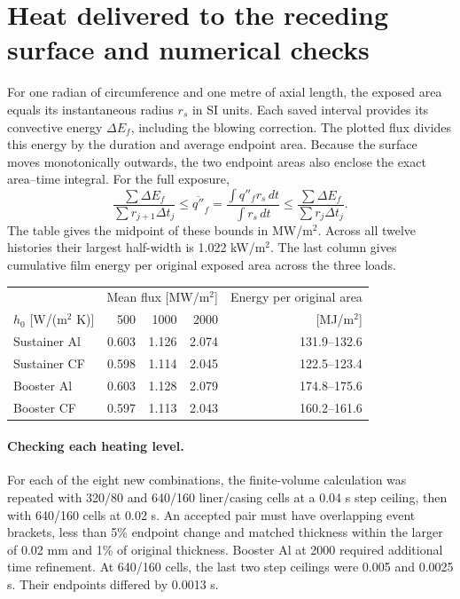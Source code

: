 \section{Heat delivered to the receding surface and numerical checks}
For one radian of circumference and one metre of axial length, the exposed
area equals its instantaneous radius $r_s$ in SI units. Each saved interval
provides its convective energy $\Delta E_f$, including the blowing correction.
The plotted flux divides this energy by the duration and average endpoint area.
Because the surface moves monotonically outwards, the two endpoint areas
also enclose the exact area--time integral. For the full exposure,
\[
 \frac{\sum\Delta E_f}{\sum r_{j+1}\Delta t_j}
 \leq \overline{q''}_f =
 \frac{\int q''_f r_s\,dt}{\int r_s\,dt}
 \leq \frac{\sum\Delta E_f}{\sum r_j\Delta t_j}.
\]
The table gives the midpoint of these bounds in MW/m$^2$. Across all
twelve histories their largest half-width is 1.022 kW/m$^2$. The last column
gives cumulative film energy per original exposed area across the three loads.
\begin{table}[H]\centering\begin{tabular}{lrrrr}\toprule
 & \multicolumn{3}{c}{Mean flux [MW/m$^2$]} & Energy per original area\\
$h_0$ [W/(m$^2$ K)] & 500 & 1000 & 2000 & [MJ/m$^2$] \\\midrule
Sustainer Al & 0.603 & 1.126 & 2.074 & 131.9--132.6 \\
Sustainer CF & 0.598 & 1.114 & 2.045 & 122.5--123.4 \\
Booster Al & 0.603 & 1.128 & 2.079 & 174.8--175.6 \\
Booster CF & 0.597 & 1.113 & 2.043 & 160.2--161.6 \\
\bottomrule\end{tabular}\end{table}
\paragraph{Checking each heating level.}
For each of the eight new combinations, the finite-volume calculation was
repeated with 320/80 and 640/160 liner/casing cells at a 0.04 s step ceiling,
then with 640/160 cells at 0.02 s. An accepted pair must have overlapping
event brackets, less than 5\% endpoint change and matched thickness within
the larger of 0.02 mm and 1\% of original thickness. Booster Al at 2000 required additional time refinement. At 640/160 cells, the last two step ceilings were 0.005 and 0.0025 s. Their endpoints differed by 0.0013 s.

